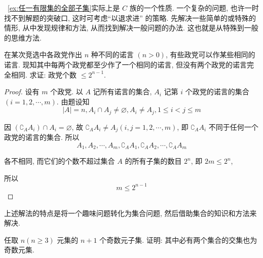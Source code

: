 \begin{note}
	~\autoref{ex:任一有限集的全部子集}实际上是 $C$ 族的一个性质. 一个复杂的问题, 也许一时找不到解题的突破口, 这时可考虑“以退求进” 的策略. 先解决一些简单的或特殊的情形, 从中发现规律和方法, 从而找到解决一般问题的办法. 这也就是从特殊到一般的思维方法.
\end{note}

\begin{example}
	在某次竞选中各政党作出 $n$ 种不同的诺言 $(n>0)$, 有些政党可以作某些相同的诺言. 现知其中每两个政党都至少作了一个相同的诺言, 但没有两个政党的诺言完全相同. 求证: 政党个数 $\leqslant 2^{n-1}$.
\end{example}

\begin{proof}
	设有 $m$ 个政党. 以 $A$ 记所有诺言的集合, $A_{i}$ 记第 $i$ 个政党的诺言的集合 $(i=1,2, \cdots, m)$. 由题设知
	$$
		|A|=n, A_{i} \cap A_{j} \neq \varnothing, A_{i} \neq A_{j}, 1 \leqslant i<j \leqslant m
	$$

	因 $\left(\complement_{A} A_{i}\right) \cap A_{i}=\varnothing$, 故 $\complement_{A} A_{i} \neq A_{j}(i, j=1,2, \cdots, m)$, 即 $\complement_{A} A_{i}$ 不同于任何一个政党的诺言的集合. 所以
	$$
		A_{1}, A_{2}, \cdots, A_{m}, \complement_{A} A_{1}, \complement_{A} A_{2}, \cdots, \complement_{A} A_{m}
	$$

	各不相同, 而它们的个数不超过集合 $A$ 的所有子集的数目 $2^{n}$, 即 $2 m \leqslant 2^{n}$,

	所以
	$$
		m \leqslant 2^{n-1}
	$$
\end{proof}

\begin{note}
	上述解法的特点是将一个趣味问题转化为集合问题, 然后借助集合的知识和方法来解决.
\end{note}

\begin{example}
	任取 $n(n \geqslant 3)$ 元集的 $n+1$ 个奇数元子集. 证明: 其中必有两个集合的交集也为奇数元集.
\end{example}

